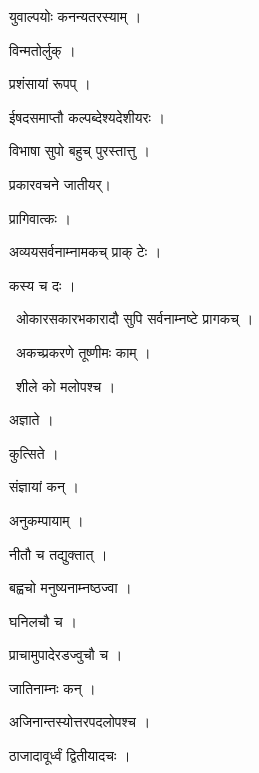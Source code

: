 \documentclass[10pt, openany, oneside]{book}
\begin{document}
\noindent युवाल्पयोः कनन्यतरस्याम् ।

\noindent विन्मतोर्लुक् ।

\noindent प्रशंसायां रूपप् ।

\noindent ईषदसमाप्तौ कल्पब्देश्यदेशीयरः ।

\noindent विभाषा सुपो बहुच् पुरस्तात्तु ।

\noindent प्रकारवचने जातीयर्।

\noindent प्रागिवात्कः ।

\noindent अव्ययसर्वनाम्नामकच् प्राक् टेः ।

\noindent कस्य च दः ।

\par\noindent\hspace{1.5em}{\vps वा॰}~{\qt ओकारसकारभकारादौ सुपि सर्वनाम्नष्टे प्रागकच् ।}

\par\noindent\hspace{1.5em}{\vps वा॰}~{\qt अकच्प्रकरणे तूष्णीमः काम् ।}

\par\noindent\hspace{1.5em}{\vps वा॰}~{\qt शीले को मलोपश्च ।}

\noindent अज्ञाते ।

\noindent कुत्सिते ।

\noindent संज्ञायां कन् ।

\noindent अनुकम्पायाम् ।

\noindent नीतौ च तद्युक्तात् ।

\noindent बह्वचो मनुष्यनाम्नष्ठज्वा ।

\noindent घनिलचौ च ।

\noindent प्राचामुपादेरडज्वुचौ च ।

\noindent जातिनाम्नः कन् ।

\noindent अजिनान्तस्योत्तरपदलोपश्च ।

\noindent ठाजादावूर्ध्वं द्वितीयादचः ।
\end{document}
